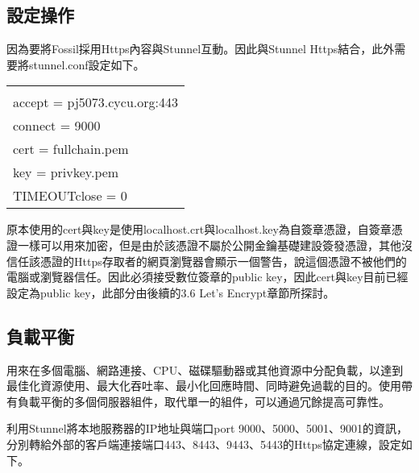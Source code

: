 \subsection{設定操作}
\par
\renewcommand{\baselinestretch}{1} %
\twelve 因為要將Fossil採用Https內容與Stunnel互動。因此與Stunnel Https結合，此外需要將stunnel.conf設定如下。
\\
\par
\begin{center}
\begin{tabular}{||p{15cm}|} %
\hline
[https]
\\
accept = pj5073.cycu.org:443
\\
connect = 9000
\\
cert = fullchain.pem
\\
key = privkey.pem
\\
TIMEOUTclose = 0
\\
\hline
\end{tabular}
\end{center}
\par
\renewcommand{\baselinestretch}{1} %
\twelve 原本使用的cert與key是使用localhost.crt與localhost.key為自簽章憑證，自簽章憑證一樣可以用來加密，但是由於該憑證不屬於公開金鑰基礎建設簽發憑證，其他沒信任該憑證的Https存取者的網頁瀏覽器會顯示一個警告，說這個憑證不被他們的電腦或瀏覽器信任。因此必須接受數位簽章的public key，因此cert與key目前已經設定為public key，此部分由後續的3.6 Let's Encrypt章節所探討。
\par

\renewcommand{\baselinestretch}{20} %
\subsection{負載平衡}
\par
\renewcommand{\baselinestretch}{1} %
\twelve 用來在多個電腦、網路連接、CPU、磁碟驅動器或其他資源中分配負載，以達到最佳化資源使用、最大化吞吐率、最小化回應時間、同時避免過載的目的。使用帶有負載平衡的多個伺服器組件，取代單一的組件，可以通過冗餘提高可靠性。
\\
\par
\renewcommand{\baselinestretch}{1} %
\twelve 利用Stunnel將本地服務器的IP地址與端口port 9000、5000、5001、9001的資訊，分別轉給外部的客戶端連接端口443、8443、9443、5443的Https協定連線，設定如下。

